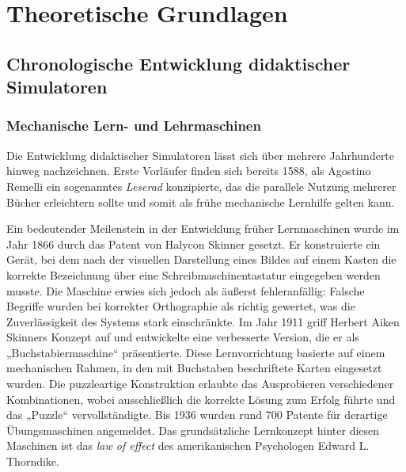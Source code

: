 \chapter{Theoretische Grundlagen}

\section{Chronologische Entwicklung didaktischer Simulatoren}


\subsection{Mechanische Lern- und Lehrmaschinen}

Die Entwicklung didaktischer Simulatoren lässt sich über mehrere Jahrhunderte hinweg nachzeichnen. Erste Vorläufer finden sich bereits 1588, als Agostino Remelli ein sogenanntes \textit{Leserad} konzipierte, das die parallele Nutzung mehrerer Bücher erleichtern sollte und somit als frühe mechanische Lernhilfe gelten kann.\parencite{cayetano_geschichte_2022}

Ein bedeutender Meilenstein in der Entwicklung früher Lernmaschinen wurde im Jahr 1866 durch das Patent von Halycon Skinner gesetzt. Er konstruierte ein Gerät, bei dem nach der visuellen Darstellung eines Bildes auf einem Kasten die korrekte Bezeichnung über eine Schreibmaschinentastatur eingegeben werden musste. Die Maschine erwies sich jedoch als äußerst fehleranfällig: Falsche Begriffe wurden bei korrekter Orthographie als richtig gewertet, was die Zuverlässigkeit des Systems stark einschränkte. Im Jahr 1911 griff Herbert Aiken Skinners Konzept auf und entwickelte eine verbesserte Version, die er als „Buchstabiermaschine“ präsentierte. Diese Lernvorrichtung basierte auf einem mechanischen Rahmen, in den mit Buchstaben beschriftete Karten eingesetzt wurden. Die puzzleartige Konstruktion erlaubte das Ausprobieren verschiedener Kombinationen, wobei ausschließlich die korrekte Lösung zum Erfolg führte und das „Puzzle“ vervollständigte. Bis 1936 wurden rund 700 Patente für derartige Übungsmaschinen angemeldet. Das grundsätzliche Lernkonzept hinter diesen Maschinen ist das \textit{law of effect} des amerikanischen Psychologen Edward L. Thorndike.\parencite[S.~3]{niegemann_kompendium_2008}

